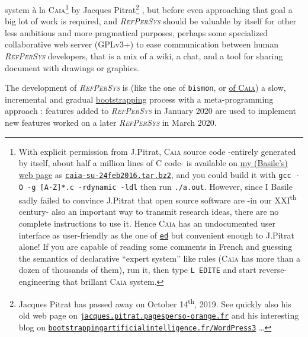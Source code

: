 \documentclass[11pt,a4paper,svgnames]{article}
\newcommand{\RefPerSys}{{\textit{\textsc{RefPerSys}}}}
\begin{document}
system à la \textsc{Caia}\footnote{With explicit permission from
  J.Pitrat, \textsc{Caia} source code -entirely generated by itself,
  about half a million lines of C code- is available on
  \href{http://starynkevitch.net/Basile/}{my (Basile's) web page} as
  \href{http://starynkevitch.net/Basile/caia-su-24feb2016.tar.bz2}{\texttt{caia-su-24feb2016.tar.bz2}},
  and you could build it with \texttt{gcc -O -g [A-Z]*.c -rdynamic
    -ldl} then run \texttt{./a.out}. However, since I Basile sadly
  failed to convince J.Pitrat that open source
  \cite{Lerner-Tirole:2000:economics-open-source,
    Weber:2004:SuccessOpenSource} software are -in our
  XXI\textsuperscript{th} century- also an important way to transmit
  research ideas, there are no complete instructions to use it. Hence
  \textsc{Caia} has an undocumented user interface as user-friendly as
  the one of \href{https://www.gnu.org/software/ed/}{\texttt{ed}} but
  convenient enough to J.Pitrat alone! If you are capable of reading
  some comments in French and guessing the semantics of declarative
  ``expert system'' like rules (\textsc{Caia} has more than a dozen of
  thousands of them), run it, then type \texttt{L EDITE} and start
  reverse-engineering that brillant \textsc{Caia} system.}  by Jacques
Pitrat\footnote{Jacques Pitrat has passed away on October
  14\textsuperscript{th}, 2019. See quickly also his old web page on
  \href{http://jacques.pitrat.pagesperso-orange.fr/}{\texttt{jacques.pitrat.pagesperso-orange.fr}}
  and his interesting blog on
  \href{http://bootstrappingartificialintelligence.fr/WordPress3/}{\texttt{bootstrappingartificialintelligence.fr/WordPress3}}
  \ldots} \cite{Pitrat:1996:FGCS, Pitrat:2009:AST,
  Pitrat:2009:ArtifBeings}, but before even approaching that goal a
big lot of work is required, and {\RefPerSys} should be valuable by
itself for other less ambitious and more pragmatical purposes, perhaps
some specialized collaborative web server (GPLv3+) to ease
communication between human {\RefPerSys} developers, that is a mix of
a wiki, a chat, and a tool for sharing document with drawings or
graphics.

The development of {\RefPerSys} is (like the one of \texttt{bismon},
or
\href{http://bootstrappingartificialintelligence.fr/WordPress3/?s=CAIA}{of
  \textsc{Caia}}) a slow, incremental and gradual
\href{https://en.wikipedia.org/wiki/Bootstrapping}{bootstrapping}
process with a meta-programming \cite{dormoy:1992:meta} approach :
features added to {\RefPerSys} in January 2020 are used to implement
new features worked on a later {\RefPerSys} in March 2020.
\end{document}
